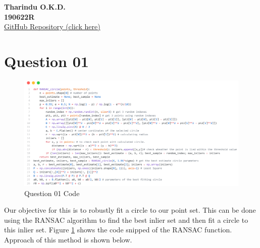 \documentclass[a4paper]{article}
\author{Tharindu O.K.D.\\19062R}
\begin{document}
\begin{center}
  \textbf{Tharindu O.K.D.\\190622R}\\
  \href{https://github.com/dakshinatharindu/Image-Processing/blob/main/Assignment-02/190622R_a02.ipynb}{GitHub Repository (click here)} 
\end{center}

\section*{Question 01}
\begin{figure}[!htb]
    \centering
    \includegraphics[width=\textwidth]{images/ransac_circle.png}
    \caption{Question 01 Code}
    \label{ransac_circle}
\end{figure}
Our objective for this is to robustly fit a circle to our point set.
 This can be done using the RANSAC algorithm to find the best inlier
  set and then fit a circle to this inlier set.
   Figure \ref{ransac_circle} shows the code snipped
    of the RANSAC function. Approach of this method is shown below.
\end{document}
